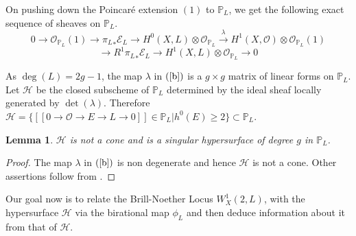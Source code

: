 \documentclass[12pt, reqno]{amsart}
\newtheorem{lemma}[theorem]{Lemma}
\begin{document}
On pushing down the Poincar\'e extension $(1)$ to $\mathbb{P}_{L}$, we get the following exact sequence of sheaves on $\mathbb{P}_{L}$.
    \begin{equation}\label{b}
          0\rightarrow \mathcal{O}_{\mathbb{P}_{L}}(1)\rightarrow {\pi_{L}}_{*}\mathcal{E}_{L}\rightarrow H^{0}(X,L)\otimes \mathcal{O}_{\mathbb{P}_{L}}\overset{\lambda}\longrightarrow H^{1}(X,\mathcal{O})\otimes \mathcal{O}_{\mathbb{P}_{L}}(1)
      \end{equation}
      \[\rightarrow R^{1}{\pi_{L}}_{*}\mathcal{E}_{L}\rightarrow H^{1}(X,L)\otimes \mathcal{O}_{\mathbb{P}_{L}}\rightarrow 0\]
      
      As $\deg(L)=2g-1$, the map $\lambda$ in $(\ref{b})$ is a $g\times g$ matrix of linear forms on $\mathbb{P}_{L}$. Let $\mathcal{H}$ be the closed subscheme of $\mathbb{P}
_{L}$ determined by the ideal sheaf locally generated by $\det(\lambda)$. Therefore $\mathcal{H}=\{[[0\rightarrow \mathcal{O}\rightarrow E\rightarrow L\rightarrow 0]]\in \mathbb{P}_{L}| h^{0}(E)\geq 2\} \subset \mathbb{P}_L$. %

\begin{lemma}\label{3.3}
$\mathcal{H}$ is not a cone and is a singular hypersurface of degree $g$ in $\mathbb{P}_{L}$.
\end{lemma}
\begin{proof}
    The map $\lambda$ in $(\ref{b})$ is non degenerate and hence $\mathcal{H}$ is not a cone. Other assertions follow from \cite[Pg. 464]{b}.
\end{proof}


Our goal now is to relate the Brill-Noether Locus $W^{1}_{X}(2,L)$, with the hypersurface $\mathcal{H}$ via the birational map $\phi_{L}$ and then deduce information about it from that of $\mathcal{H}$.
\end{document}
